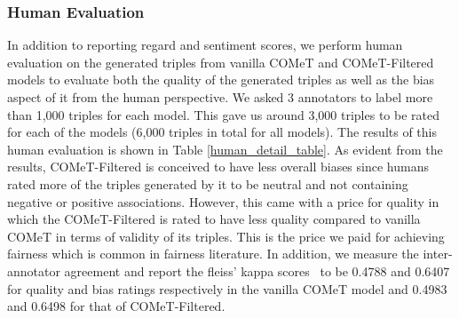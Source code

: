 \subsubsection{Human Evaluation}
In addition to reporting regard and sentiment scores, we perform human evaluation on the generated triples from vanilla COMeT and COMeT-Filtered  models to evaluate both the quality of the generated triples as well as the bias aspect of it from the human perspective. We asked 3 annotators to label more than 1,000 triples for each model. This gave us around 3,000 triples to be rated for each of the models (6,000 triples in total for all models). The results of this human evaluation is shown in Table \ref{human_detail_table}. As evident from the results, COMeT-Filtered is conceived to have less overall biases since humans rated more of the triples generated by it to be neutral and not containing negative or positive associations. However, this came with a price for quality in which the COMeT-Filtered is rated to have less quality compared to vanilla COMeT in terms of validity of its triples. This is the price we paid for achieving fairness which is common in fairness literature. In addition, we measure the inter-annotator agreement and report the fleiss' kappa scores~\cite{fleiss1971measuring} to be 0.4788 and 0.6407 for quality and bias ratings respectively in the vanilla COMeT model and 0.4983 and 0.6498 for that of COMeT-Filtered.

